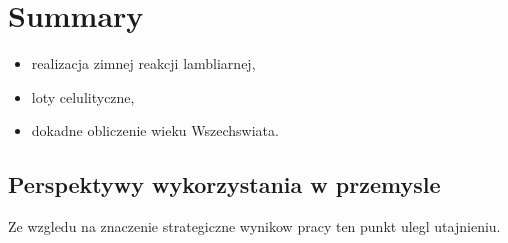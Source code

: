 \chapter{Summary}

\begin{itemize}
\item realizacja zimnej reakcji lambliarnej,
\item loty celulityczne,
\item dokadne obliczenie wieku Wszechswiata.
\end{itemize}

\section{Perspektywy wykorzystania w przemysle}

Ze wzgledu na znaczenie strategiczne wynikow pracy ten punkt ulegl
utajnieniu.
